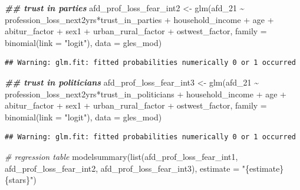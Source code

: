 \documentclass[
]{article}
\newenvironment{Shaded}{\begin{snugshade}}{\end{snugshade}}
\newcommand{\AttributeTok}[1]{\textcolor[rgb]{0.77,0.63,0.00}{#1}}
\newcommand{\CommentTok}[1]{\textcolor[rgb]{0.56,0.35,0.01}{\textit{#1}}}
\newcommand{\DocumentationTok}[1]{\textcolor[rgb]{0.56,0.35,0.01}{\textbf{\textit{#1}}}}
\newcommand{\FunctionTok}[1]{\textcolor[rgb]{0.00,0.00,0.00}{#1}}
\newcommand{\NormalTok}[1]{#1}
\newcommand{\OtherTok}[1]{\textcolor[rgb]{0.56,0.35,0.01}{#1}}
\newcommand{\SpecialCharTok}[1]{\textcolor[rgb]{0.00,0.00,0.00}{#1}}
\newcommand{\StringTok}[1]{\textcolor[rgb]{0.31,0.60,0.02}{#1}}
\begin{document}
\begin{Shaded}
\begin{Highlighting}[]
\DocumentationTok{\#\# trust in parties }
\NormalTok{afd\_prof\_loss\_fear\_int2 }\OtherTok{\textless{}{-}} \FunctionTok{glm}\NormalTok{(afd\_21 }\SpecialCharTok{\textasciitilde{}}\NormalTok{ profession\_loss\_next2yrs}\SpecialCharTok{*}\NormalTok{trust\_in\_parties }\SpecialCharTok{+}\NormalTok{ household\_income }\SpecialCharTok{+}\NormalTok{ age }\SpecialCharTok{+}\NormalTok{ abitur\_factor }\SpecialCharTok{+}\NormalTok{ sex1 }\SpecialCharTok{+}\NormalTok{ urban\_rural\_factor }\SpecialCharTok{+}\NormalTok{ ostwest\_factor, }
                             \AttributeTok{family =} \FunctionTok{binomial}\NormalTok{(}\AttributeTok{link =} \StringTok{"logit"}\NormalTok{),}
                             \AttributeTok{data =}\NormalTok{ gles\_mod)}
\end{Highlighting}
\end{Shaded}

\begin{verbatim}
## Warning: glm.fit: fitted probabilities numerically 0 or 1 occurred
\end{verbatim}

\begin{Shaded}
\begin{Highlighting}[]
\DocumentationTok{\#\# trust in politicians}
\NormalTok{afd\_prof\_loss\_fear\_int3 }\OtherTok{\textless{}{-}} \FunctionTok{glm}\NormalTok{(afd\_21 }\SpecialCharTok{\textasciitilde{}}\NormalTok{ profession\_loss\_next2yrs}\SpecialCharTok{*}\NormalTok{trust\_in\_politicians }\SpecialCharTok{+}\NormalTok{ household\_income }\SpecialCharTok{+}\NormalTok{ age }\SpecialCharTok{+}\NormalTok{ abitur\_factor }\SpecialCharTok{+}\NormalTok{ sex1 }\SpecialCharTok{+}\NormalTok{ urban\_rural\_factor }\SpecialCharTok{+}\NormalTok{ ostwest\_factor, }
                             \AttributeTok{family =} \FunctionTok{binomial}\NormalTok{(}\AttributeTok{link =} \StringTok{"logit"}\NormalTok{),}
                             \AttributeTok{data =}\NormalTok{ gles\_mod)}
\end{Highlighting}
\end{Shaded}

\begin{verbatim}
## Warning: glm.fit: fitted probabilities numerically 0 or 1 occurred
\end{verbatim}

\begin{Shaded}
\begin{Highlighting}[]
\CommentTok{\# regression table }
\FunctionTok{modelsummary}\NormalTok{(}\FunctionTok{list}\NormalTok{(afd\_prof\_loss\_fear\_int1, afd\_prof\_loss\_fear\_int2, afd\_prof\_loss\_fear\_int3),}
             \AttributeTok{estimate =} \StringTok{"\{estimate\}\{stars\}"}\NormalTok{)}
\end{Highlighting}
\end{Shaded}
\end{document}
